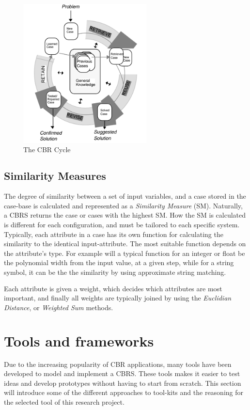 \begin{figure}[H]
    \centering
    \includegraphics[width=0.6\textwidth]{fig/cbr_cycle.png}
    \caption{The CBR Cycle}
    \label{fig:cbr_cycle}
\end{figure}

\subsection{Similarity Measures}
The degree of similarity between a set of input variables, and a case stored in the case-base is calculated and represented as a \emph{Similarity Measure} (SM). Naturally, a CBRS returns the case or cases with the highest SM. How the SM is calculated is different for each configuration, and must be tailored to each specific system. Typically, each attribute in a case has its own function for calculating the similarity to the identical input-attribute. The most suitable function depends on the attribute's type. For example will a typical function for an integer or float be the polynomial width from the input value, at a given step, while for a string symbol, it can be the the similarity by using approximate string matching. 

Each attribute is given a weight, which decides which attributes are most important, and finally all weights are typically joined by using the \emph{Euclidian Distance}, or \emph{Weighted Sum} methods.

\section{Tools and frameworks}

Due to the increasing popularity of CBR applications\cite{kolodner2014case}, many tools have been developed to model and implement a CBRS. These tools makes it easier to test ideas and develop prototypes without having to start from scratch. This section will introduce some of the different approaches to tool-kits and the reasoning for the selected tool of this research project. 

